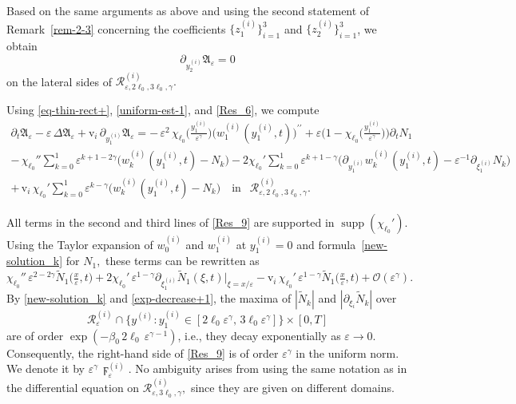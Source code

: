 \documentclass[reqno]{amsart}            %
\numberwithin{equation}{section}
\begin{document}
	
	Based on the same arguments as above and using the second statement of 
	Remark~\ref{rem-2-3} concerning the coefficients 
	$\{z^{(i)}_1\}_{i=1}^3$ and $\{z^{(i)}_2\}_{i=1}^3$, we obtain
	\begin{equation}\label{Res_8}
		\partial_{y^{(i)}_2}\mathfrak{A}_\varepsilon = 0
	\end{equation}
	on the lateral sides of $\mathcal{R}^{(i)}_{\varepsilon,2\ell_0,3\ell_0,\gamma}.$ 
	
	
	
	Using \eqref{eq-thin-rect+}, \eqref{uniform-est-1}, and \eqref{Res_6}, we compute
	\begin{multline}\label{Res_9}
		\partial_t \mathfrak{A}_\varepsilon
		- \varepsilon\, \Delta \mathfrak{A}_\varepsilon
		+ \mathrm{v}_i\, \partial_{y^{(i)}_1}\mathfrak{A}_\varepsilon
		=
		-\,\varepsilon^2\, 
		\chi_{\ell_0}\!\Big(\frac{y^{(i)}_1}{\varepsilon^\gamma}\Big)
		\big(w^{(i)}_{1}(y^{(i)}_1,t)\big)^{\prime\prime}
		+ \varepsilon\Big(1-\chi_{\ell_0}\!\Big(\frac{y^{(i)}_1}{\varepsilon^\gamma}\Big)\Big)\partial_t N_1
		\\
		-\,\chi_{\ell_0}'' 
		\sum_{k=0}^{1}\varepsilon^{k+1-2\gamma}\big(w_k^{(i)}(y^{(i)}_1,t)-N_k\big)
		- 2\chi_{\ell_0}' 
		\sum_{k=0}^{1}\varepsilon^{k+1-\gamma}
		\Big(\partial_{y^{(i)}_1}w_k^{(i)}(y^{(i)}_1,t)
		- \varepsilon^{-1}\partial_{\xi_1^{(i)}}N_k\Big)
		\\
		+\,\mathrm{v}_i\,\chi_{\ell_0}'
		\sum_{k=0}^{1}\varepsilon^{k-\gamma}\big(w_k^{(i)}(y^{(i)}_1,t)-N_k\big)
		\quad\text{in }\ \ \mathcal{R}^{(i)}_{\varepsilon,2\ell_0,3\ell_0,\gamma}.
	\end{multline}
	
	All terms in the second and third lines of \eqref{Res_9} are supported in 
	$\operatorname{supp}(\chi_{\ell_0}')$.  
	Using the Taylor expansion of $w_0^{(i)}$ and $w_1^{(i)}$ at $y^{(i)}_1=0$ and 
	formula~\eqref{new-solution_k} for $N_1,$  these terms can be rewritten as
	\begin{equation*}
		\chi_{\ell_0}''\, \varepsilon^{2-2\gamma}\widetilde{N}_1\big(\tfrac{x}{\varepsilon},t\big)
		+ 2\chi_{\ell_0}' \, \varepsilon^{1-\gamma}
		\partial_{\xi_1^{(i)}}\widetilde{N}_1(\xi,t)\big|_{\xi=x/\varepsilon}
		- \mathrm{v}_i\,\chi_{\ell_0}' \, 
		\varepsilon^{1-\gamma}\widetilde{N}_1\big(\tfrac{x}{\varepsilon},t\big)
		+ \mathcal{O}(\varepsilon^\gamma).
	\end{equation*}
	By \eqref{new-solution_k} and \eqref{exp-decrease+1}, the maxima of 
	$|\widetilde{N}_k|$ and $|\partial_{\xi_i}\widetilde{N}_k|$ over
	\[
	\mathcal{R}^{(i)}_\varepsilon \cap 
	\big\{y^{(i)}: y^{(i)}_1\in[2\ell_0\varepsilon^\gamma,\,3\ell_0\varepsilon^\gamma]\big\}
	\times[0,T]
	\]
	are of order $\exp(-\beta_0\,2\ell_0\,\varepsilon^{\gamma-1})$, i.e., they decay exponentially as 
	$\varepsilon\to 0$.  
	Consequently, the right-hand side of \eqref{Res_9} is of order $\varepsilon^\gamma$ in the uniform norm. We denote it by $\varepsilon^\gamma\, \digamma^{(i)}_\varepsilon.$ 
	No ambiguity arises from using the same notation as in the differential equation on $\mathcal{R}^{(i)}_{\varepsilon,3\ell_0,\gamma},$
	since they are given  on different domains.
	
\end{document}
